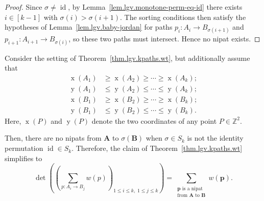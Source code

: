 \begin{proof}
\leanok
Since $\sigma \ne \operatorname{id}$, by
Lemma~\ref{lem.lgv.monotone-perm-eq-id} there exists $i \in [k-1]$
with $\sigma(i) > \sigma(i+1)$.  The sorting conditions then satisfy
the hypotheses of Lemma~\ref{lem.lgv.baby-jordan} for paths
$p_i : A_i \to B_{\sigma(i+1)}$ and $p_{i+1} : A_{i+1} \to B_{\sigma(i)}$,
so these two paths must intersect.  Hence no nipat exists.
\end{proof}

\begin{corollary}
\label{cor.lgv.kpaths.wt-np}
\leantarget
\leanok
Consider the setting of Theorem~\ref{thm.lgv.kpaths.wt}, but
additionally assume that
\begin{align}
  \operatorname{x}(A_1) &\ge \operatorname{x}(A_2) \ge \cdots \ge \operatorname{x}(A_k);
    \label{eq.cor.lgv.kpaths.wt-np.xA} \\
  \operatorname{y}(A_1) &\le \operatorname{y}(A_2) \le \cdots \le \operatorname{y}(A_k);
    \label{eq.cor.lgv.kpaths.wt-np.yA} \\
  \operatorname{x}(B_1) &\ge \operatorname{x}(B_2) \ge \cdots \ge \operatorname{x}(B_k);
    \label{eq.cor.lgv.kpaths.wt-np.xB} \\
  \operatorname{y}(B_1) &\le \operatorname{y}(B_2) \le \cdots \le \operatorname{y}(B_k).
    \label{eq.cor.lgv.kpaths.wt-np.yB}
\end{align}
Here, $\operatorname{x}(P)$ and $\operatorname{y}(P)$ denote the two
coordinates of any point $P \in \mathbb{Z}^2$.

Then, there are no nipats from $\mathbf{A}$ to $\sigma(\mathbf{B})$
when $\sigma \in S_k$ is not the identity permutation
$\operatorname{id} \in S_k$.  Therefore, the claim of
Theorem~\ref{thm.lgv.kpaths.wt} simplifies to
\begin{equation}
  \det\!\left(\left(\sum_{p : A_i \to B_j} w(p)\right)_{1 \le i \le k,\; 1 \le j \le k}\right)
  = \sum_{\substack{\mathbf{p} \text{ is a nipat} \\ \text{from } \mathbf{A} \text{ to } \mathbf{B}}}
    w(\mathbf{p}).
  \label{eq.cor.lgv.kpaths.wt-np.claim}
\end{equation}
\end{corollary}

